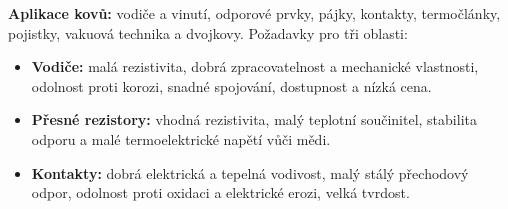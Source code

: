 \textbf{Aplikace kovů:} vodiče a vinutí, odporové prvky, pájky, kontakty, termočlánky, pojistky, vakuová technika a dvojkovy. Požadavky pro tři oblasti:
\begin{itemize}
\item \textbf{Vodiče:} malá rezistivita, dobrá zpracovatelnost a mechanické vlastnosti, odolnost proti korozi, snadné spojování, dostupnost a nízká cena.
\item \textbf{Přesné rezistory:} vhodná rezistivita, malý teplotní součinitel, stabilita odporu a malé termoelektrické napětí vůči mědi.
\item \textbf{Kontakty:} dobrá elektrická a tepelná vodivost, malý stálý přechodový odpor, odolnost proti oxidaci a elektrické erozi, velká tvrdost.
\end{itemize}
